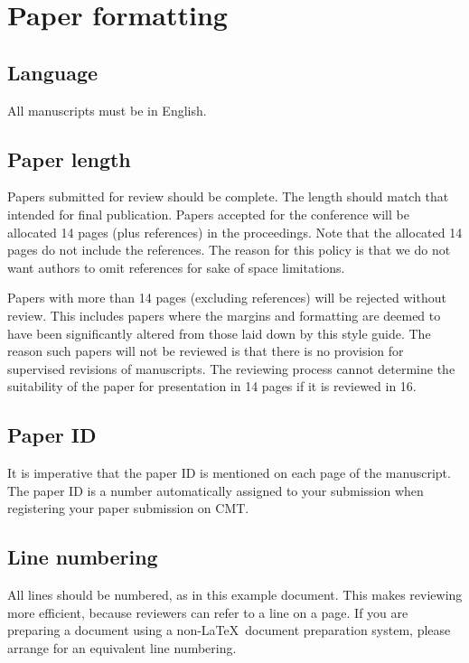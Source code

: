 \documentclass[runningheads]{llncs}
\begin{document}
\section{Paper formatting}

\subsection{Language}

All manuscripts must be in English.

\subsection{Paper length}
Papers submitted for review should be complete. 
The length should match that intended for final publication. 
Papers accepted for the conference will be allocated 14 pages (plus references) in the proceedings. 
Note that the allocated 14 pages do not include the references. The reason for this policy
is that we do not want authors to omit references for sake of space limitations.

Papers with more than 14 pages (excluding references) will be rejected without review.
This includes papers where the margins and
formatting are deemed to have been significantly altered from those
laid down by this style guide.  The reason such papers will not be
reviewed is that there is no provision for supervised revisions of
manuscripts. The reviewing process cannot determine the suitability of
the paper for presentation in 14 pages if it is reviewed in 16.

\subsection{Paper ID}

It is imperative that the paper ID is mentioned on each page of the manuscript.
The paper ID is a number automatically assigned to your submission when 
registering your paper submission on CMT.


\subsection{Line numbering}

All lines should be numbered, as in this example document.  This makes
reviewing more efficient, because reviewers can refer to a line on a
page.  If you are preparing a document using a non-\LaTeX\
document preparation system, please arrange for an equivalent line numbering.
\end{document}
